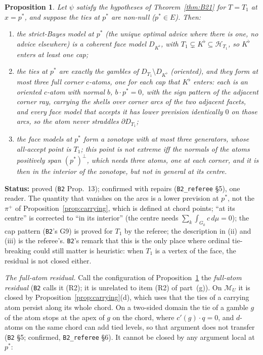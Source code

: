 \documentclass[11pt]{article}
\newtheorem{proposition}[theorem]{Proposition}
\theoremstyle{definition}
\theoremstyle{remark}
\newcommand{\M}{\mathcal M}
\newcommand{\src}[1]{\texttt{#1}}
\newcommand{\status}[1]{\par\smallskip\noindent\textbf{Status:} #1\par\smallskip}
\begin{document}
\begin{proposition}\label{prop:B213}
Let $\psi$ satisfy the hypotheses of Theorem~\ref{thm:B21} for $T=T_1$ at $x=p^*$, and suppose the ties at $p^*$ are non-null ($p^*\in E$). Then:
\begin{enumerate}[leftmargin=*,label=(\roman*)]
\item the strict-Bayes model at $p^*$ (the unique optimal advice where there is one, no advice elsewhere) is a coherent face model $D_{K^\flat}$, with $T_1\subsetneq K^\flat\subseteq\mathcal H_{T_1}$, so $K^\flat$ enters at least one cap;
\item the ties at $p^*$ are exactly the gambles of $D_{T_1}\setminus D_{K^\flat}$ (oriented), and they form at most three \emph{full corner $c$-atoms}, one for each cap that $K^\flat$ enters: each is an oriented $c$-atom with normal $b$, $b\cdot p^*=0$, with the sign pattern of the adjacent corner ray, carrying the shells over corner arcs of the two adjacent facets, and every face model that accepts it has lower prevision identically $0$ on those arcs, so the atom never straddles $\partial D_{T_1}$;
\item the face models at $p^*$ form a zonotope with at most three generators, whose all-accept point is $T_1$; this point is not extreme iff the normals of the atoms positively span $(p^*)^\perp$, which needs three atoms, one at each corner, and it is then in the interior of the zonotope, but not in general at its centre.
\end{enumerate}
\end{proposition}
\status{proved (\src{B2} Prop.~13); confirmed with repairs (\src{B2\_referee} \S5), one reader. The quantity that vanishes on the arcs is a lower prevision at $p^*$, not the $\pi^+$ of Proposition~\ref{prop:carrying}, which is defined at chord points; ``at its centre'' is corrected to ``in its interior'' (the centre needs $\sum_k\int_{G_k}c\,d\mu=0$); the cap pattern (\src{B2}'s G9) is proved for $T_1$ by the referee; the description in (ii) and (iii) is the referee's. \src{B2}'s remark that this is the only place where ordinal tie-breaking could still matter is heuristic: when $T_1$ is a vertex of the face, the residual is not closed either.}

\emph{The full-atom residual.} Call the configuration of Proposition~\ref{prop:B213} the \emph{full-atom residual} (\src{B2} calls it (R2); it is unrelated to item (R2) of part~(g)). On $\M_U$ it is closed by Proposition~\ref{prop:carrying}(d), which uses that the ties of a carrying atom persist along its whole chord. On a two-sided domain the tie of a gamble $g$ of the atom stops at the apex of $g$ on the chord, where $c'(g)\cdot q=0$, and $d$-atoms on the same chord can add tied levels, so that argument does not transfer (\src{B2} \S5; confirmed, \src{B2\_referee} \S6). It cannot be closed by any argument local at $p^*$:
\end{document}
